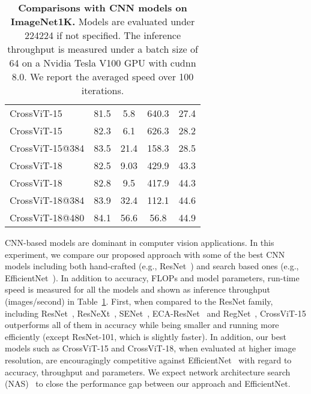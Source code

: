 \documentclass[10pt,twocolumn,letterpaper]{article}
\def\ours{CrossViT\xspace}
\newcommand{\myparagraph}[1]{\vspace{1mm} \noindent {\textbf{#1}}}
\begin{document}
\begin{table}[t]
\begin{adjustbox}{max width=\linewidth}
\begin{tabular}{l|c|c|c|c}
\midrule
            \ours-15& 81.5 & 5.8 & 640.3 & 27.4 \\
            \ours-15 & 82.3 & 6.1 & 626.3 & 28.2 \\ 
            \ours-15@384 & 83.5 & 21.4 & 158.3 & 28.5 \\ 
\ours-18& 82.5& 9.03 & 429.9 & 43.3 \\ 
            \ours-18 & 82.8 & 9.5 & 417.9 & 44.3 \\ 
\ours-18@384& 83.9 & 32.4 & 112.1 & 44.6 \\ 
            \ours-18@480& 84.1 & 56.6 & 56.8 & 44.9 \\
\bottomrule
    \end{tabular}
    \end{adjustbox}
\caption{\textbf{Comparisons with CNN models on ImageNet1K.} Models are evaluated under 224224 if not specified. 
    The inference throughput is measured under a batch size of 64 on a Nvidia Tesla V100 GPU with cudnn 8.0. We report the averaged speed over 100 iterations.}
    \label{table:compare_cnn}
\end{table}





 
\myparagraph{Comparisons with CNN-based Models.}
CNN-based models are dominant in computer vision applications. In this experiment, we compare our proposed approach with some of the best CNN models including both hand-crafted (e.g., ResNet~\cite{ResNet_He_2016_CVPR}) and search based ones (e.g., EfficientNet~\cite{efficientnet_pmlr_tan_19}).
In addition to accuracy, FLOPs and model parameters, run-time speed is measured for all the models and shown as inference throughput (images/second) in Table~\ref{table:compare_cnn}.
First, when compared to the ResNet family, including ResNet~\cite{ResNet_He_2016_CVPR}, ResNeXt~\cite{ResNeXt_Xie_2017_CVPR}, SENet~\cite{SENet_Hu_2018}, ECA-ResNet~\cite{ECA_wang2020} and RegNet~\cite{RegNet_Radosavovic_2020_CVPR}, \ours-15 outperforms all of them in accuracy while being smaller and running more efficiently (except ResNet-101, which is slightly faster).
In addition, our best models such as \ours-15 and \ours-18, when evaluated at higher image resolution, are encouragingly competitive against EfficientNet~\cite{efficientnet_pmlr_tan_19} with regard to accuracy, throughput and parameters. We expect network architecture search (NAS)~\cite{Nasnet_Zoph_2018_CVPR} to close the performance gap between our approach and EfficientNet. 
\end{document}
